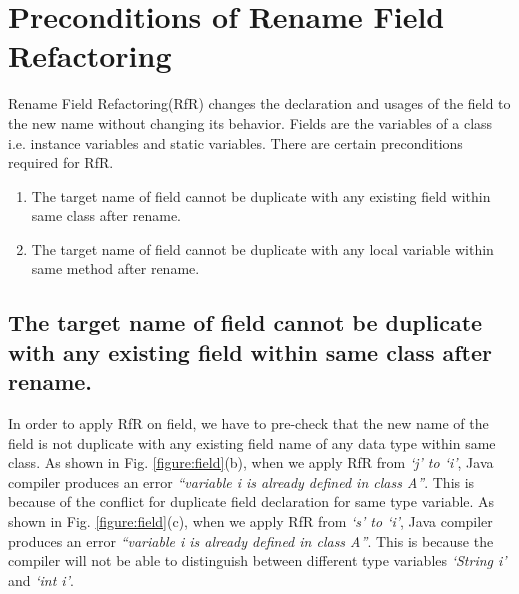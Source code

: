 \section{\textbf{Preconditions of Rename Field Refactoring}}
Rename Field Refactoring(RfR) changes the declaration and usages of the field to the new name without changing its behavior.
Fields are the variables of a class i.e. instance variables and static variables.
There are certain preconditions required for RfR.

\begin{enumerate}
	\item The target name of field cannot be duplicate with any existing field within same class after rename.
	\item The target name of field cannot be duplicate with any local variable within same method after rename.
\end{enumerate}

\subsection{The target name of field cannot be duplicate with any existing field within same class after rename.}

In order to apply RfR on field, we have to pre-check that the new name of the field is not duplicate with any existing field name of any data type within same class. As shown in Fig. \ref{figure:field}(b), when we apply RfR from \emph{`j' to `i'}, Java compiler produces an error \textit{``variable i is already defined in class A''}. This is because of the conflict for duplicate field declaration for same type variable. As shown in Fig. \ref{figure:field}(c), when we apply RfR from \emph{`s' to `i'}, Java compiler produces an error \textit{``variable i is already defined in class A''}. This is because the compiler will not be able to distinguish between different type variables \emph{`String i'} and \emph{`int i'}.


